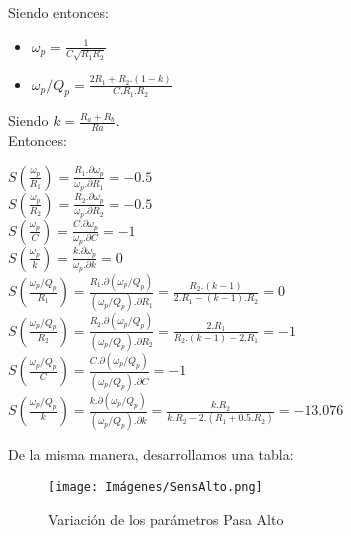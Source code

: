     Siendo entonces:\\

    \begin{itemize}
        \item $\omega_p = \frac{1}{C\sqrt{R_1R_2}}$
        \item $\omega_p/Q_p = \frac{2R_1+R_2.(1-k)}{C.R_1.R_2}$
    \end{itemize}

    Siendo $k = \frac{R_a + R_b}{Ra}$.\\

    Entonces:\\

    \begin{center}
        $S(\frac{\omega_p}{R_1}) = \frac{R_1.\partial\omega_p}{\omega_p.\partial R_1} = -0.5$\\
        
        $S(\frac{\omega_p}{R_2}) = \frac{R_2.\partial\omega_p}{\omega_p.\partial R_2} = -0.5$\\
        
        $S(\frac{\omega_p}{C}) = \frac{C.\partial\omega_p}{\omega_p.\partial C} = -1$\\

        $S(\frac{\omega_p}{k}) = \frac{k.\partial\omega_p}{\omega_p.\partial k} = 0$\\
        
        $S(\frac{\omega_p/Q_p}{R_1}) = \frac{R_1.\partial(\omega_p/Q_p)}{(\omega_p/Q_p).\partial R_1} = \frac{R_2.(k-1)}{2.R_1-(k-1).R_2} = 0$\\
        
        $S(\frac{\omega_p/Q_p}{R_2}) = \frac{R_2.\partial(\omega_p/Q_p)}{(\omega_p/Q_p).\partial R_2} = \frac{2.R_1}{R_2.(k-1)-2.R_1} = -1$\\

        $S(\frac{\omega_p/Q_p}{C}) = \frac{C.\partial(\omega_p/Q_p)}{(\omega_p/Q_p).\partial C} = -1$\\

        $S(\frac{\omega_p/Q_p}{k}) = \frac{k.\partial(\omega_p/Q_p)}{(\omega_p/Q_p).\partial k} = \frac{k.R_2}{k.R_2-2.(R_1+0.5.R_2)} = -13.076$\\
    \end{center}  

    De la misma manera, desarrollamos una tabla:\\

    \begin{figure}[ht]
        \centering
        \texttt{[image: Imágenes/SensAlto.png]}
        \caption{Variación de los parámetros Pasa Alto}
    \end{figure}


